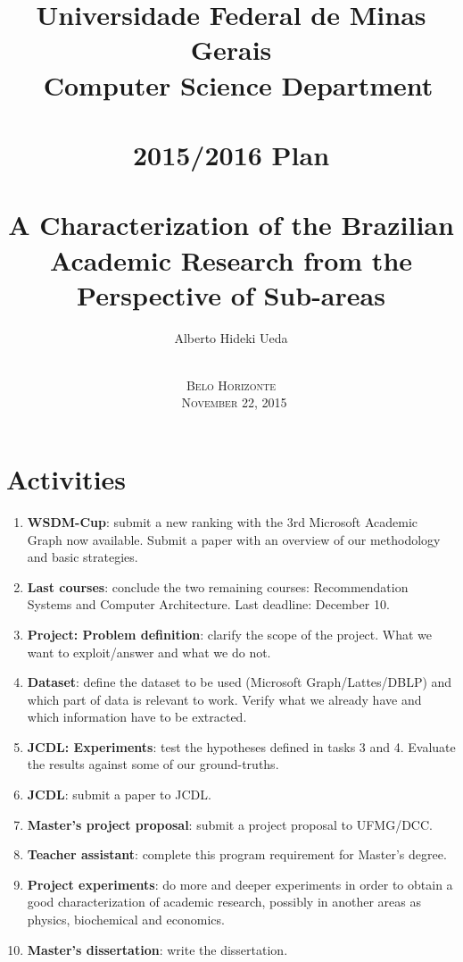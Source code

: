 \documentclass[a4paper,12pt,titlepage]{article}
\title{\large
Universidade Federal de Minas Gerais \\ \
Computer Science Department \\ \
\\[1cm]
2015/2016 Plan\\ \
\\[1cm]
\textbf{\Large A Characterization of the Brazilian Academic Research from the Perspective of Sub-areas}
\\[1cm]
}
\author{\large Alberto Hideki Ueda \\[0.5cm] 
\\[3cm] }
\date{\textsc{Belo Horizonte\\ \
November 22, 2015}}
\begin{document}
\maketitle

\section{Activities} 

\begin{enumerate}
\item{\textbf {WSDM-Cup}}: submit a new ranking with the 3rd Microsoft Academic Graph now available. Submit a paper with an overview of our methodology and basic strategies.
\item{\textbf {Last courses}}: conclude the two remaining courses: Recommendation Systems and Computer Architecture. Last deadline: December 10.
\item{\textbf {Project: Problem definition}}: clarify the scope of the project. What we want to exploit/answer and what we do not.
\item{\textbf {Dataset}}: define the dataset to be used (Microsoft Graph/Lattes/DBLP) and which part of data is relevant to work. Verify what we already have and which information have to be extracted. 
\item{\textbf {JCDL: Experiments}}: test the hypotheses defined in tasks 3 and 4. Evaluate the results against some of our ground-truths.
\item{\textbf {JCDL}}: submit a paper to JCDL.
\item{\textbf {Master's project proposal}}: submit a project proposal to UFMG/DCC.
\item{\textbf {Teacher assistant}}: complete this program requirement for Master's degree.
\item{\textbf {Project experiments}}: do more and deeper experiments in order to obtain a good characterization of academic research, possibly in another areas as physics, biochemical and economics.
\item{\textbf {Master's dissertation}}: write the dissertation.
\end {enumerate}
\end{document}
